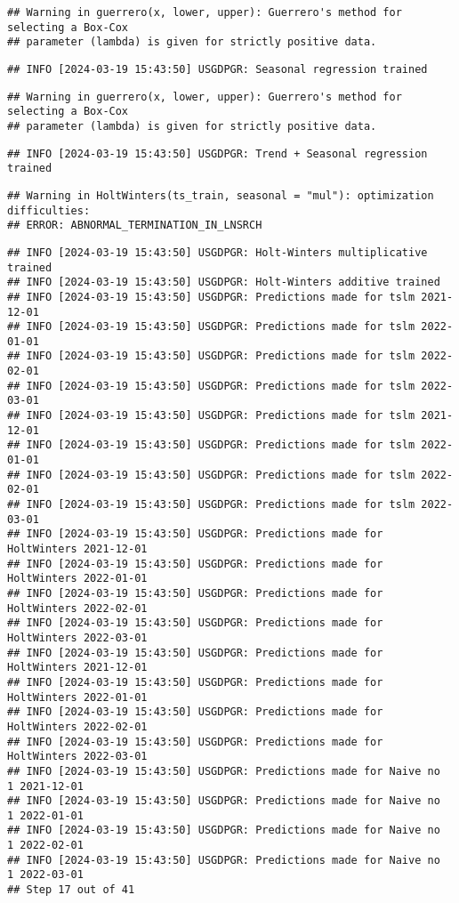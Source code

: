 \documentclass[
]{article}
\begin{document}
\begin{verbatim}
## Warning in guerrero(x, lower, upper): Guerrero's method for selecting a Box-Cox
## parameter (lambda) is given for strictly positive data.
\end{verbatim}

\begin{verbatim}
## INFO [2024-03-19 15:43:50] USGDPGR: Seasonal regression trained
\end{verbatim}

\begin{verbatim}
## Warning in guerrero(x, lower, upper): Guerrero's method for selecting a Box-Cox
## parameter (lambda) is given for strictly positive data.
\end{verbatim}

\begin{verbatim}
## INFO [2024-03-19 15:43:50] USGDPGR: Trend + Seasonal regression trained
\end{verbatim}

\begin{verbatim}
## Warning in HoltWinters(ts_train, seasonal = "mul"): optimization difficulties:
## ERROR: ABNORMAL_TERMINATION_IN_LNSRCH
\end{verbatim}

\begin{verbatim}
## INFO [2024-03-19 15:43:50] USGDPGR: Holt-Winters multiplicative trained
## INFO [2024-03-19 15:43:50] USGDPGR: Holt-Winters additive trained
## INFO [2024-03-19 15:43:50] USGDPGR: Predictions made for tslm 2021-12-01
## INFO [2024-03-19 15:43:50] USGDPGR: Predictions made for tslm 2022-01-01
## INFO [2024-03-19 15:43:50] USGDPGR: Predictions made for tslm 2022-02-01
## INFO [2024-03-19 15:43:50] USGDPGR: Predictions made for tslm 2022-03-01
## INFO [2024-03-19 15:43:50] USGDPGR: Predictions made for tslm 2021-12-01
## INFO [2024-03-19 15:43:50] USGDPGR: Predictions made for tslm 2022-01-01
## INFO [2024-03-19 15:43:50] USGDPGR: Predictions made for tslm 2022-02-01
## INFO [2024-03-19 15:43:50] USGDPGR: Predictions made for tslm 2022-03-01
## INFO [2024-03-19 15:43:50] USGDPGR: Predictions made for HoltWinters 2021-12-01
## INFO [2024-03-19 15:43:50] USGDPGR: Predictions made for HoltWinters 2022-01-01
## INFO [2024-03-19 15:43:50] USGDPGR: Predictions made for HoltWinters 2022-02-01
## INFO [2024-03-19 15:43:50] USGDPGR: Predictions made for HoltWinters 2022-03-01
## INFO [2024-03-19 15:43:50] USGDPGR: Predictions made for HoltWinters 2021-12-01
## INFO [2024-03-19 15:43:50] USGDPGR: Predictions made for HoltWinters 2022-01-01
## INFO [2024-03-19 15:43:50] USGDPGR: Predictions made for HoltWinters 2022-02-01
## INFO [2024-03-19 15:43:50] USGDPGR: Predictions made for HoltWinters 2022-03-01
## INFO [2024-03-19 15:43:50] USGDPGR: Predictions made for Naive no  1 2021-12-01
## INFO [2024-03-19 15:43:50] USGDPGR: Predictions made for Naive no  1 2022-01-01
## INFO [2024-03-19 15:43:50] USGDPGR: Predictions made for Naive no  1 2022-02-01
## INFO [2024-03-19 15:43:50] USGDPGR: Predictions made for Naive no  1 2022-03-01
## Step 17 out of 41
\end{verbatim}
\end{document}
